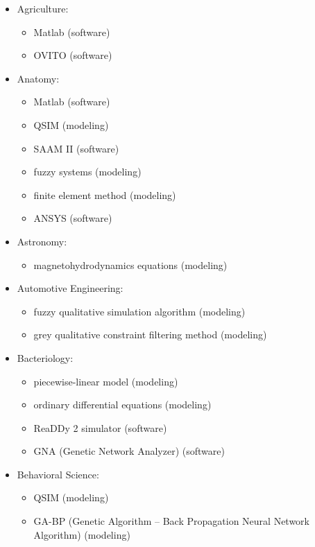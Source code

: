 \documentclass[utf8]{gradu3}
\begin{document}
\begin{itemize}
    \item Agriculture:
    \begin{itemize}
        \item Matlab (software)
        \item OVITO (software)
    \end{itemize}
    \item Anatomy:
        \begin{itemize}
            \item Matlab (software)
            \item QSIM (modeling)
            \item SAAM II (software)
            \item fuzzy systems (modeling)
            \item finite element method (modeling)
            \item ANSYS (software)
        \end{itemize}
    \item Astronomy:
        \begin{itemize}
            \item magnetohydrodynamics equations (modeling)
        \end{itemize}
    \item Automotive Engineering:
    \begin{itemize}
        \item fuzzy qualitative simulation algorithm (modeling)
        \item grey qualitative constraint filtering method (modeling)
    \end{itemize}
    \item Bacteriology:
    \begin{itemize}
        \item piecewise-linear model (modeling)
        \item ordinary differential equations (modeling)
        \item ReaDDy 2 simulator (software)
        \item GNA (Genetic Network Analyzer) (software)
    \end{itemize}
    \item Behavioral Science:
    \begin{itemize}
        \item QSIM (modeling)
        \item GA-BP (Genetic Algorithm – Back Propagation Neural Network Algorithm) (modeling)

\end{itemize}
\end{itemize}
\end{document}
